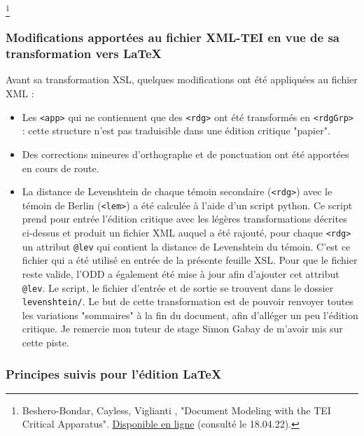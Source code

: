 \documentclass[12pt, a4paper]{article}
\begin{document}
          \footnote{
                Beshero-Bondar, Cayless, Viglianti
              , "Document Modeling with the TEI Critical Apparatus". \href{http://bit.ly/crit-app-panel}{Disponible en ligne} (consulté le 18.04.22).}
                \subsubsection{Modifications apportées au fichier XML-TEI en vue de 
                sa transformation vers \LaTeX}
                
            Avant sa transformation XSL, quelques modifications ont été appliquées
            au fichier XML :
            \begin{itemize}
                \item{Les \texttt{<app>} qui ne contiennent que des 
                \texttt{<rdg>} ont été transformés en \texttt{<rdgGrp>} :
                cette structure n'est pas traduisible dans une édition critique "papier".}
                \item{Des corrections mineures d'orthographe et de ponctuation ont été 
                apportées en cours de route.}
                \item{La distance de Levenshtein de chaque témoin secondaire 
                (\texttt{<rdg>}) avec le témoin de Berlin (\texttt{<lem>}) a été
                calculée à l'aide d'un script python. Ce script prend pour entrée l'édition
                critique avec les légères transformations décrites ci-dessus et produit un 
                fichier XML auquel a été rajouté, pour chaque \texttt{<rdg>} un attribut
                \texttt{@lev} qui contient la distance de Levenshtein du témoin. C'est ce fichier
                qui a été utilisé en entrée de la présente feuille XSL. Pour que le fichier
                reste valide, l'ODD a également été mise à jour afin d'ajouter cet attribut 
                \texttt{@lev}. Le script, le fichier d'entrée et de sortie se trouvent dans
                le dossier \texttt{levenshtein/}. Le but de cette transformation est de pouvoir renvoyer
                toutes les variations "sommaires" à la fin du document, afin d'alléger
                un peu l'édition critique. Je remercie mon tuteur de stage Simon Gabay
                de m'avoir mis sur cette piste.}
            \end{itemize}
        
                \subsubsection{Principes suivis pour l'édition \LaTeX}
                
\end{document}

